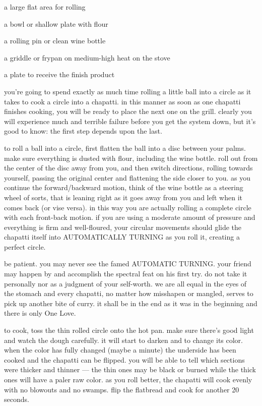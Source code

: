 \begin{ingredients}
  \item a large flat area for rolling
  \item a bowl or shallow plate with flour
  \item a rolling pin or clean wine bottle
  \item a griddle or frypan on medium-high heat on the stove
  \item a plate to receive the finish product
\end{ingredients}

you're going to spend exactly as much time rolling a little ball into a circle 
as it takes to cook a circle into a chapatti. in this manner as soon as one 
chapatti finishes cooking, you will be ready to place the next one on the 
grill. clearly you will experience much and terrible failure before you get the 
system down, but it's good to know: the first step depends upon the last.

to roll a ball into a circle, first flatten the ball into a disc between your 
palms. make sure everything is dusted with flour, including the wine bottle. 
roll out from the center of the disc away from you, and then switch directions, 
rolling towards yourself, passing the original center and flattening the side 
closer to you. as you continue the forward/backward motion, think of the wine 
bottle as a steering wheel of sorts, that is leaning right as it goes away from 
you and left when it comes back (or vise versa). in this way you are actually 
rolling a complete circle with each front-back motion. if you are using a 
moderate amount of pressure and everything is firm and well-floured, your 
circular movements should glide the chapatti itself into AUTOMATICALLY TURNING 
as you roll it, creating a perfect circle.

be patient. you may never see the famed AUTOMATIC TURNING. your friend may 
happen by and accomplish the spectral feat on his first try. do not take it 
personally nor as a judgment of your self-worth. we are all equal in the eyes 
of the stomach and every chapatti, no matter how misshapen or mangled, serves 
to pick up another bite of curry. it shall be in the end as it was in the 
beginning and there is only One Love.

to cook, toss the thin rolled circle onto the hot pan. make sure there's good 
light and watch the dough carefully. it will start to darken and to change its 
color. when the color has fully changed (maybe a minute) the underside has been 
cooked and the chapatti can be flipped. you will be able to tell which sections 
were thicker and thinner --- the thin ones may be black or burned while the 
thick ones will have a paler raw color. as you roll better, the chapatti will 
cook evenly with no blowouts and no swamps. flip the flatbread and cook for 
another 20 seconds.

